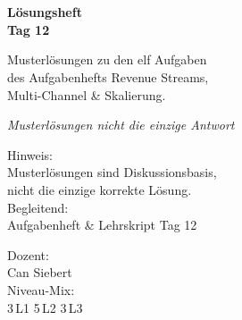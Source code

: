 \documentclass[11pt,a4paper,oneside]{article}
\newcommand{\caveatfontfallback}{\itshape}
\newcommand\caveatfont{\caveatfontfallback}%
\begin{document}
\begin{titlepage}
  \pagestyle{empty}
  \vspace*{1.5cm}
  \\[2pt]
  \noindent{\color{lpAccent}\rule{\linewidth}{1.2pt}}\\[4pt]

  \vspace{3cm}
  {\sffamily\fontsize{30}{34}\selectfont\bfseries\color{lpInk}Lösungsheft\\Tag 12\par}

  \vspace{0.7cm}
  {\sffamily\large\color{lpGray}Musterlösungen zu den elf Aufgaben\\des Aufgabenhefts \textendash{} Revenue Streams,\\Multi-Channel \& Skalierung.\par}

  \vspace{1.5cm}
  {\caveatfont\LARGE\color{lpGreen}Musterlösungen \textperiodcentered{} nicht die einzige Antwort}\par

  \vfill

  \noindent\begin{minipage}{0.55\linewidth}
    {\sffamily\footnotesize\color{lpGray}Hinweis:}\\
    {\sffamily\small\color{lpInk}Musterlösungen sind Diskussionsbasis,\\nicht die einzige korrekte Lösung.}\\[10pt]
    {\sffamily\footnotesize\color{lpGray}Begleitend:}\\
    {\sffamily\small\color{lpInk}Aufgabenheft \& Lehrskript Tag 12}
  \end{minipage}\hfill
  \begin{minipage}{0.4\linewidth}
    \raggedleft
    {\sffamily\footnotesize\color{lpGray}Dozent:}\\
    {\sffamily\small\color{lpInk}Can Siebert}\\[10pt]
    {\sffamily\footnotesize\color{lpGray}Niveau-Mix:}\\
    {\sffamily\small\color{lpInk}3\,L1 \textperiodcentered{} 5\,L2 \textperiodcentered{} 3\,L3}
  \end{minipage}

  \vspace{0.5cm}
  \noindent{\color{lpAccent}\rule{\linewidth}{0.6pt}}
\end{titlepage}
\end{document}
